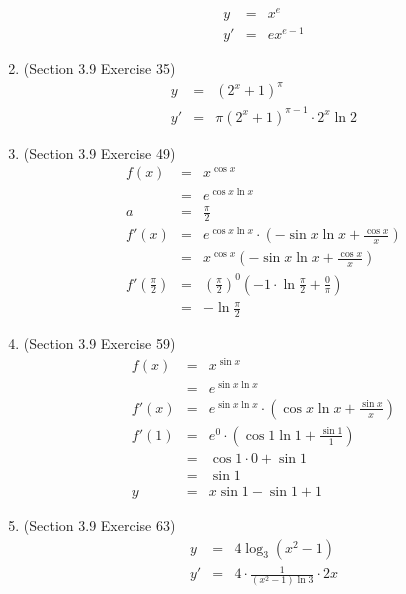 \documentclass{article}
\begin{document}
\begin{enumerate}
\begin{eqnarray}
            y &=& x^e \\
            y' &=& ex^{e-1}
        \end{eqnarray}
    \item (Section 3.9 Exercise 35)
        \begin{eqnarray}
            y &=& \left(2^x + 1\right)^\pi \\
            y' &=& \pi(2^x + 1)^{\pi - 1} \cdot 2^x\ln{2}
        \end{eqnarray}
    \item (Section 3.9 Exercise 49)
        \begin{eqnarray}
            f(x) &=& x^{\cos{x}} \\
                 &=& e^{\cos{x}\ln{x}} \\
            a &=& \frac{\pi}{2} \\
            f'(x) &=& e^{\cos{x}\ln{x}} \cdot \left(-\sin{x}\ln{x} + \frac{\cos{x}}{x}\right) \\
                  &=& x^{\cos{x}}\left(-\sin{x}\ln{x} + \frac{\cos{x}}{x}\right) \\
            f'\left(\frac{\pi}{2}\right) &=& \left(\frac{\pi}{2}\right)^0 \left(-1\cdot\ln{\frac{\pi}{2}} + \frac{0}{\pi}\right) \\
                                         &=& -\ln{\frac{\pi}{2}}
        \end{eqnarray}
    \item (Section 3.9 Exercise 59)
        \begin{eqnarray}
            f(x) &=& x^{\sin{x}} \\
                 &=& e^{\sin{x}\ln{x}} \\
            f'(x) &=& e^{\sin{x}\ln{x}} \cdot \left(\cos{x}\ln{x} + \frac{\sin{x}}{x}\right) \\
            f'(1) &=& e^0 \cdot \left(\cos{1}\ln{1} + \frac{\sin{1}}{1}\right) \\
                  &=& \cos{1} \cdot 0 + \sin{1} \\
                  &=& \sin{1} \\
            y &=& x\sin{1} - \sin{1} + 1
        \end{eqnarray}
    \item (Section 3.9 Exercise 63)
        \begin{eqnarray}
            y &=& 4\log_3{\left(x^2 - 1\right)} \\
            y' &=& 4 \cdot \frac{1}{\left(x^2 - 1\right)\ln{3}} \cdot 2x \\

\end{eqnarray}
\end{enumerate}
\end{document}
